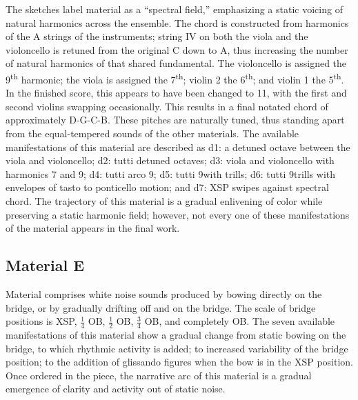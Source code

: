 The sketches label material  as a ``spectral field,'' emphasizing a static voicing of natural harmonics across the ensemble. The chord is constructed from harmonics of the A strings of the instruments; string IV on both the viola and the violoncello is retuned from the original C down to A, thus increasing the number of natural harmonics of that shared fundamental. The violoncello is assigned the 9\textsuperscript{th} harmonic; the viola is assigned the 7\textsuperscript{th}; violin 2 the 6\textsuperscript{th}; and violin 1 the 5\textsuperscript{th}. In the finished score, this appears to have been changed to 11\textdegree, with the first and second violins swapping occasionally. This results in a final notated chord of approximately D-G-C-B. These pitches are naturally tuned, thus standing apart from the equal-tempered sounds of the other materials. The available manifestations of this material are described as d1: a detuned octave between the viola and violoncello; d2: tutti detuned octaves; d3: viola and violoncello with harmonics 7 and 9; d4: tutti arco 9\textdegree; d5: tutti 9\textdegree with trills; d6: tutti 9\textdegree trills with envelopes of tasto to ponticello motion; and d7: \ac{XSP} swipes against spectral chord. The trajectory of this material is a gradual enlivening of color while preserving a static harmonic field; however, not every one of these manifestations of the material appears in the final work.

\subsection{Material E}

Material  comprises white noise sounds produced by bowing directly on the bridge, or by gradually drifting off and on the bridge. The scale of bridge positions is \ac{XSP}, $\frac{1}{4}$ \ac{OB}, $\frac{1}{2}$ \ac{OB}, $\frac{3}{4}$ \ac{OB}, and completely \ac{OB}. The seven available manifestations of this material show a gradual change from static bowing on the bridge, to which rhythmic activity is added; to increased variability of the bridge position; to the addition of glissando figures when the bow is in the \ac{XSP} position. Once ordered in the piece, the narrative arc of this material is a gradual emergence of clarity and activity out of static noise.

